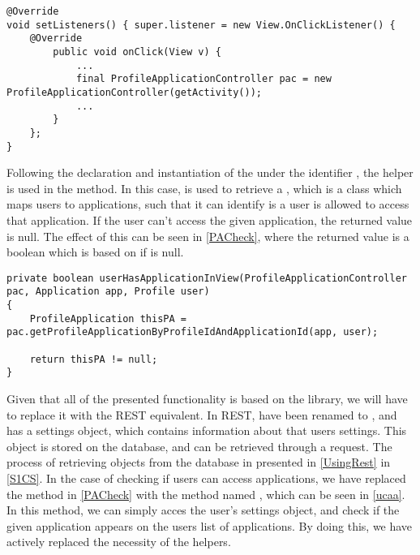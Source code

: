 \begin{minipage}[H]{\linewidth}
\begin{lstlisting}[caption = Declaration of the ProfileApplicationController which is used to retrieve information about ProfileApplications, label = pac]
@Override 
void setListeners() { super.listener = new View.OnClickListener() {
	@Override
    	public void onClick(View v) {
			...
            final ProfileApplicationController pac = new ProfileApplicationController(getActivity());
			...
    	}
	};
}
\end{lstlisting}
\end{minipage}

Following the declaration and instantiation of the
 under the identifier , the
helper is used in the  method. In this case,
 is used to retrieve a , which is a class
which maps users to applications, such that it can identify is a user is allowed
to access that application. If the user can't access the given application, the
returned value is null. The effect of this can be seen in \autoref{PACheck},
where the returned value is a boolean which is based on if  is
null.\nl

\begin{minipage}[H]{\linewidth}
\begin{lstlisting}[caption = Method which checks if a user is allowed to access an application, label = PACheck] 
private boolean userHasApplicationInView(ProfileApplicationController pac, Application app, Profile user) 
{ 
	ProfileApplication thisPA = pac.getProfileApplicationByProfileIdAndApplicationId(app, user);

    return thisPA != null;
}
\end{lstlisting}
\end{minipage}

Given that all of the presented functionality is based on the 
library, we will have to replace it with the REST equivalent. In REST,
 have been renamed to , and has a settings object,
which contains information about that users settings. This object is stored on
the database, and can be retrieved through a request. The process of retrieving
objects from the database in presented in \autoref{UsingRest} in \autoref{S1CS}.
In the case of checking if users can access applications, we have replaced the
method in \autoref{PACheck} with the method named ,
which can be seen in \autoref{ucaa}. In this method, we can simply acces the
user's settings object, and check if the given application appears on the users
list of applications. By doing this, we have actively replaced the
necessity of the  helpers.\nl

